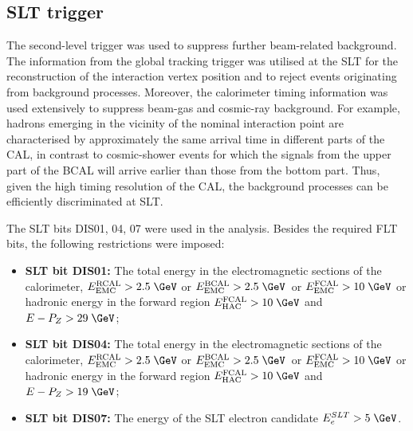 \subsection{SLT trigger}
\label{subsec:sltcuts}
The second-level trigger was used to suppress further beam-related background. The information from the \zeus global tracking trigger was utilised at the SLT for the reconstruction of the interaction vertex position and to reject events originating from background processes. Moreover, the calorimeter timing information was used extensively to suppress beam-gas and cosmic-ray background. For example, hadrons emerging in the vicinity of the nominal interaction point are characterised by approximately the same arrival time in different parts of the CAL, in contrast to cosmic-shower events for which the signals from the upper part of the BCAL will arrive earlier than those from the bottom part. Thus, given the high timing resolution of the CAL, the background processes can be efficiently discriminated at SLT.

The SLT bits DIS01, 04, 07 were used in the analysis. Besides the required FLT bits, the following restrictions were imposed:
\begin{itemize}
	\item \textbf{SLT bit DIS01:} The total energy in the electromagnetic sections of the calorimeter, $E_\text{EMC}^\text{RCAL} > 2.5\;\GeV$ or $E_\text{EMC}^\text{BCAL} > 2.5\;\GeV$~or $E_\text{EMC}^\text{FCAL} > 10\;\GeV$ or hadronic energy in the forward region $E_\text{HAC}^\text{FCAL} > 10\;\GeV$ and $E-P_Z > 29\;\GeV$;
	\item \textbf{SLT bit DIS04:} The total energy in the electromagnetic sections of the calorimeter, $E_\text{EMC}^\text{RCAL} > 2.5\;\GeV$ or $E_\text{EMC}^\text{BCAL} > 2.5\;\GeV$~or $E_\text{EMC}^\text{FCAL} > 10\;\GeV$ or hadronic energy in the forward region $E_\text{HAC}^\text{FCAL} > 10\;\GeV$ and $E-P_Z > 19\;\GeV$;
	\item \textbf{SLT bit DIS07:} The energy of the SLT electron candidate $E_e^{SLT}>5\;\GeV$.
\end{itemize}
